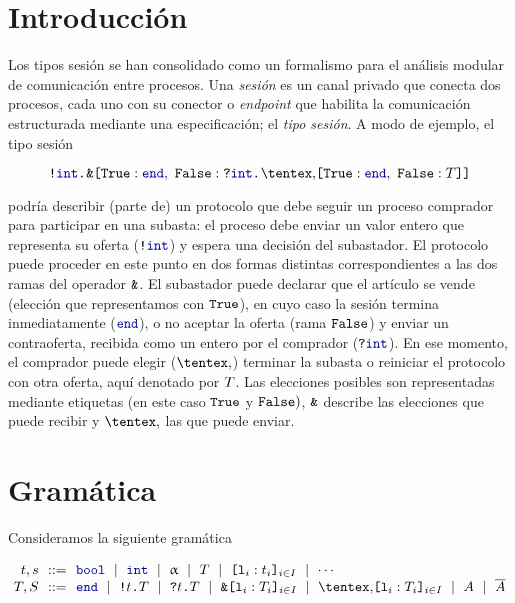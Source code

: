 \section{Introducción}

Los tipos sesión se han consolidado como un formalismo para el
análisis modular de comunicación entre procesos. Una \emph{sesión} es un canal
privado que conecta dos procesos, cada uno con su conector o \emph{endpoint}
que habilita la comunicación estructurada mediante una especificación; el
\emph{tipo sesión}. A modo de ejemplo, el tipo sesión

\begin{equation}
    \label{eq:bare.auction}
    \Out\tint{
        \BinaryPBranch[]\End{
            \In\tint{
                \BinaryPChoice[]\End\T
            }
        }
    }
\end{equation}

\noindent podría describir (parte de) un protocolo que debe seguir un proceso comprador
para participar en una subasta: el proceso debe enviar un valor entero que representa su
oferta ($ \Out [] \tint $) y espera una decisión del subastador. El protocolo
puede proceder en este punto en dos formas distintas correspondientes a las dos
ramas del operador $\Branch$. El subastador puede declarar que el artículo se
vende (elección que representamos con $\Tag[True]$), en cuyo caso la sesión
termina inmediatamente ($ \End $), o no aceptar la oferta (rama $\Tag[False]$)
y enviar un contraoferta, recibida como un entero por el comprador ($ \In []
\tint $). En ese momento, el comprador puede elegir ($\Choice$) terminar la
subasta o reiniciar el protocolo con otra oferta, aquí denotado por $\T$. Las
elecciones posibles son representadas mediante etiquetas (en este caso
$\Tag[True]$ y $\Tag[False])$, $\Branch$ describe las elecciones que puede
recibir y $\Choice$ las que puede enviar.

\section{Gramática}

Consideramos la siguiente gramática

\[
\begin{array}{@{}r@{~~}c@{~~}l@{}}
\TypeT, \TypeS & ::= &
\tbool
\rulemid \tint
\rulemid \tvar
\rulemid \SessionType
\rulemid \set[i\in I]{ \Tag_i : \Type_i }
\rulemid \cdots
\\
\SessionTypeT, \SessionTypeS & ::= &
\End
\rulemid \Out\Type\SessionType
\rulemid \In\Type\SessionType
\rulemid \Branch \set[i\in I]{\Tag_i : \SessionType_i}
\rulemid \Choice \set[i\in I]{\Tag_i : \SessionType_i}
\rulemid \etvar
\rulemid \dual\etvar
\end{array}
\]


